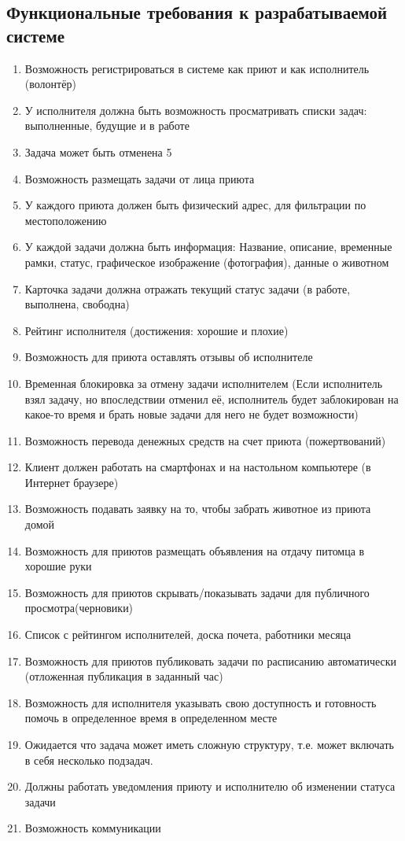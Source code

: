 \documentclass[12pt]{article}
\begin{document}
\subsection*{Функциональные требования к разрабатываемой системе}
\begin{enumerate}
\item Возможность регистрироваться в системе как приют и как исполнитель (волонтёр)
\item  У исполнителя должна быть возможность просматривать списки задач: выполненные, будущие и в работе
\item  Задача может быть отменена 5
\item  Возможность размещать задачи от лица приюта
\item  У каждого приюта должен быть физический адрес, для фильтрации по местоположению
\item  У каждой задачи должна быть информация: Название, описание, временные рамки, статус, графическое изображение (фотография), данные о животном
\item  Карточка задачи должна отражать текущий статус задачи (в работе, выполнена, свободна)
\item  Рейтинг исполнителя (достижения: хорошие и плохие)
\item  Возможность для приюта оставлять отзывы об исполнителе
\item  Временная блокировка за отмену задачи исполнителем (Если исполнитель взял задачу, но впоследствии отменил её, исполнитель будет заблокирован на какое-то время и брать новые задачи для него не будет возможности)
\item  Возможность перевода денежных средств на счет приюта (пожертвований)
\item  Клиент должен работать на смартфонах и на настольном компьютере (в Интернет браузере)
\item  Возможность подавать заявку на то, чтобы забрать животное из приюта домой
\item  Возможность для приютов размещать объявления на отдачу питомца в хорошие руки
\item  Возможность для приютов скрывать/показывать задачи для публичного просмотра(черновики)
\item  Список с рейтингом исполнителей, доска почета, работники месяца
\item  Возможность для приютов публиковать задачи по расписанию автоматически (отложенная публикация в заданный час)
\item  Возможность для исполнителя указывать свою доступность и готовность помочь в определенное время в определенном месте
\item  Ожидается что задача может иметь сложную структуру, т.е. может включать в себя несколько подзадач.
\item  Должны работать уведомления приюту и исполнителю об изменении статуса задачи
\item  Возможность коммуникации 
\end{enumerate}
\end{document}
